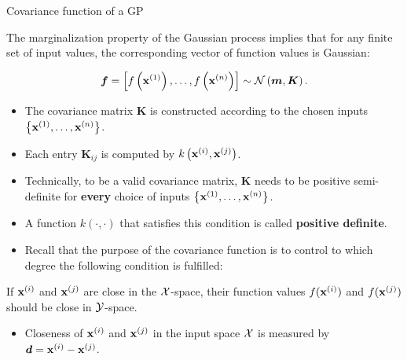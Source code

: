 \begin{frame}[c,allowframebreaks]{Covariance function of a GP}

    The marginalization property of the Gaussian process implies that for any finite set of input values, the corresponding vector of function values is Gaussian:

  $$
    \bm{f} = \left[f\left(\mathbf{x}^{(1)}\right),\dots, f\left(\mathbf{x}^{(n)}\right)\right] \sim \mathcal{N}\left(\bm{m}, \bm{K}\right).
  $$ 


\begin{itemize}

  \item The covariance matrix $\bm{K}$ is constructed according to the chosen inputs $\left\{\mathbf{x}^{(1)},\dots,\mathbf{x}^{(n)}\right\}$.
  \item Each entry $\bm{K}_{ij}$ is computed by $k\left(\mathbf{x}^{(i)}, \mathbf{x}^{(j)}\right)$.
  \item Technically, to be a valid covariance matrix, $\bm{K}$ needs to be positive semi-definite for \textbf{every} choice of inputs $\left\{\mathbf{x}^{(1)},\dots,\mathbf{x}^{(n)}\right\}$.
  \item A function $k(\cdot,\cdot)$ that satisfies this condition is called \textbf{positive definite}.
  
\end{itemize}
\framebreak

\begin{itemize}
\item Recall that the purpose of the covariance function is to control to which degree the following condition is fulfilled:
\end{itemize}
\lz
\begin{displayquote}
If $\mathbf{x}^{(i)}$ and $\mathbf{x}^{(j)}$ are close in the $\mathcal{X}$-space, their function values $f(\mathbf{x}^{(i)})$ and $f(\mathbf{x}^{(j)})$ should be close in $\mathcal{Y}$-space.
\end{displayquote}

\lz
\lz

\begin{itemize}
\item[\faLightbulbO] Closeness of $\mathbf{x}^{(i)}$ and $\mathbf{x}^{(j)}$ in the input space $\mathcal{X}$ is measured by $\bm{d} =\mathbf{x}^{(i)}-\mathbf{x}^{(j)}$. 


\end{itemize}

\end{frame}

